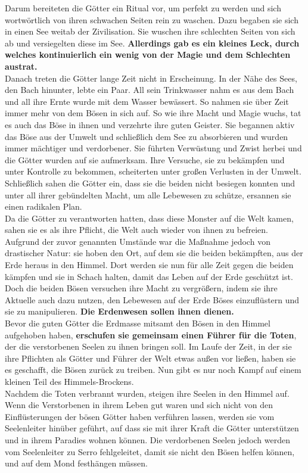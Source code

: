 Darum bereiteten die Götter ein Ritual vor, um perfekt zu werden und sich wortwörtlich von ihren schwachen Seiten rein zu waschen. 
Dazu begaben sie sich in einen See weitab der Zivilisation. 
Sie wuschen ihre schlechten Seiten von sich ab und versiegelten diese im See. 
\textbf{Allerdings gab es ein kleines Leck, durch welches kontinuierlich ein wenig von der Magie und dem Schlechten austrat.}\\
Danach treten die Götter lange Zeit nicht in Erscheinung. 
In der Nähe des Sees, den Bach hinunter, lebte ein Paar. 
All sein Trinkwasser nahm es aus dem Bach und all ihre Ernte wurde mit dem Wasser bewässert. 
So nahmen sie über Zeit immer mehr von dem Bösen in sich auf.
So wie ihre Macht und Magie wuchs, tat es auch das Böse in ihnen und verzehrte ihre guten Geister. 
Sie begannen aktiv das Böse aus der Umwelt und schließlich dem See zu absorbieren und wurden immer mächtiger und verdorbener. 
Sie führten Verwüstung und Zwist herbei und die Götter wurden auf sie aufmerksam. 
Ihre Versuche, sie zu bekämpfen und unter Kontrolle zu bekommen, scheiterten unter großen Verlusten in der Umwelt. 
Schließlich sahen die Götter ein, dass sie die beiden nicht besiegen konnten und unter all ihrer gebündelten Macht, um alle Lebewesen zu schütze, ersannen sie einen radikalen Plan.\\
Da die Götter zu verantworten hatten, dass diese Monster auf die Welt kamen, sahen sie es als ihre Pflicht, die Welt auch wieder von ihnen zu befreien. 
Aufgrund der zuvor genannten Umstände war die Maßnahme jedoch von drastischer Natur: sie hoben den Ort, auf dem sie die beiden bekämpften, aus der Erde heraus in den Himmel. 
Dort werden sie nun für alle Zeit gegen die beiden kämpfen und sie in Schach halten, damit das Leben auf der Erde geschützt ist.\\
Doch die beiden Bösen versuchen ihre Macht zu vergrößern, indem sie ihre Aktuelle auch dazu nutzen, den Lebewesen auf der Erde Böses einzuflüstern und sie zu manipulieren. 
\textbf{Die Erdenwesen sollen ihnen dienen.}\\
Bevor die guten Götter die Erdmasse mitsamt den Bösen in den Himmel aufgehoben haben, \textbf{erschufen sie gemeinsam einen Führer für die Toten}, der die verstorbenen Seelen zu ihnen bringen soll. 
Im Laufe der Zeit, in der sie ihre Pflichten als Götter und Führer der Welt etwas außen vor ließen, haben sie es geschafft, die Bösen zurück zu treiben. 
Nun gibt es nur noch Kampf auf einem kleinen Teil des Himmels-Brockens.\\
Nachdem die Toten verbrannt wurden, steigen ihre Seelen in den Himmel auf.
Wenn die Verstorbenen in ihrem Leben gut waren und sich nicht von den Einflüsterungen der bösen Götter haben verführen lassen, werden sie vom Seelenleiter hinüber geführt, auf dass sie mit ihrer Kraft die Götter unterstützen und in ihrem Paradies wohnen können. 
Die verdorbenen Seelen jedoch werden vom Seelenleiter zu Serro fehlgeleitet, damit sie nicht den Bösen helfen können, und auf dem Mond festhängen müssen.

